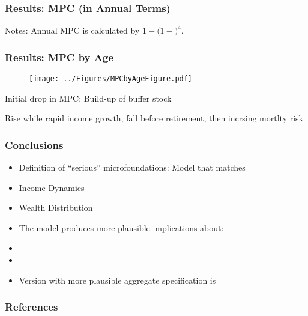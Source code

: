 \begin{frame}
\frametitle{{Results: MPC (in Annual Terms)}}
\begin{scriptsize}
\begin{table}

\end{table}
\tiny{Notes: Annual MPC is calculated by $1-(1-$$)^{4}$.
}
\end{scriptsize}
\end{frame}



\begin{frame}
\frametitle{Results: MPC by Age}

\begin{figure}
\centering
\texttt{[image: ../Figures/MPCbyAgeFigure.pdf]}
\label{LifeCycleLorenzPlotByAge}
\end{figure}

\bi \scriptsize
\item Initial drop in MPC: Build-up of buffer stock
\item Rise while rapid income growth, fall before retirement, then incrsing mortlty risk
\ei

\end{frame}

\begin{frame}
\frametitle{{Conclusions}}
\begin{itemize}
  \item Definition of ``serious'' microfoundations: Model that matches
\bi
\item Income Dynamics
\item Wealth Distribution
\ei
  \item The model produces more plausible implications about:
  \bi
  \item {}
  \item {}
  \ei
  \item Version with more plausible aggregate specification is\\
\end{itemize}
\end{frame}




\nocite{castaneda}


\beamerdefaultoverlayspecification{<*>}

\begin{frame}[allowframebreaks]
\frametitle{{References}}
\tiny

\end{frame}

